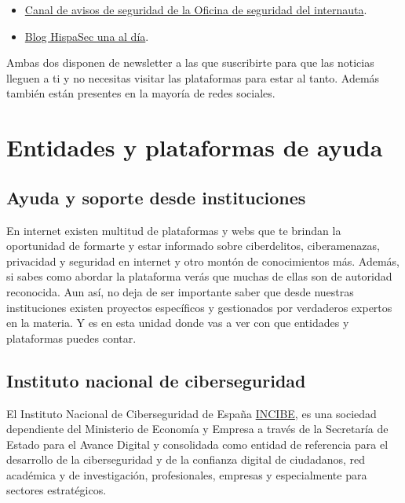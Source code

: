 \documentclass[
  a4paper,
  openany]{book}
\begin{document}
\begin{itemize}
\item
  \href{https://www.osi.es/es/actualidad/avisos}{Canal de avisos de seguridad de la Oficina de seguridad del internauta}.
\item
  \href{https://unaaldia.hispasec.com/}{Blog HispaSec una al día}.
\end{itemize}

Ambas dos disponen de newsletter a las que suscribirte para que las noticias lleguen a ti y no necesitas visitar las plataformas para estar al tanto. Además también están presentes en la mayoría de redes sociales.

\hypertarget{entidades-y-plataformas-de-ayuda}{%
\chapter{Entidades y plataformas de ayuda}\label{entidades-y-plataformas-de-ayuda}}

\hypertarget{ayuda-y-soporte-desde-instituciones}{%
\section{Ayuda y soporte desde instituciones}\label{ayuda-y-soporte-desde-instituciones}}

En internet existen multitud de plataformas y webs que te brindan la oportunidad de formarte y estar informado sobre ciberdelitos, ciberamenazas, privacidad y seguridad en internet y otro montón de conocimientos más. Además, si sabes como abordar la plataforma verás que muchas de ellas son de autoridad reconocida. Aun así, no deja de ser importante saber que desde nuestras instituciones existen proyectos específicos y gestionados por verdaderos expertos en la materia. Y es en esta unidad donde vas a ver con que entidades y plataformas puedes contar.

\hypertarget{instituto-nacional-de-ciberseguridad}{%
\section{Instituto nacional de ciberseguridad}\label{instituto-nacional-de-ciberseguridad}}

El Instituto Nacional de Ciberseguridad de España \href{https://www.incibe.es/}{INCIBE}, es una sociedad dependiente del Ministerio de Economía y Empresa a través de la Secretaría de Estado para el Avance Digital y consolidada como entidad de referencia para el desarrollo de la ciberseguridad y de la confianza digital de ciudadanos, red académica y de investigación, profesionales, empresas y especialmente para sectores estratégicos.
\end{document}
